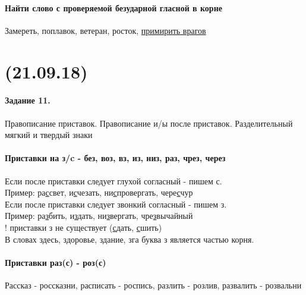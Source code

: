 \documentclass{article}
\begin{document}
\paragraph{Найти слово с проверяемой безударной гласной в корне}

Замереть, поплавок, ветеран, росток, \underline{примирить врагов}




\paragraph{}
\noindent\makebox[\linewidth]{\rule{\paperwidth}{0.4pt}}
\section{(21.09.18)}
\noindent\makebox[\linewidth]{\rule{\paperwidth}{0.4pt}}

\paragraph{Задание 11.} Правописание приставок. Правописание и/ы после приставок.
  Разделительный мягкий и твердый знаки

\paragraph{Приставки на з/c - без, воз, вз, из, низ, раз, чрез, через}
Если после приставки следует глухой согласный - пишем с.\\
Пример: ра\underline{с}свет, и\underline{с}чезать, ни\underline{с}провергать, чере\underline{с}чур\\

Если после приставки следует звонкий согласный - пишем з.\\
Пример: ра\underline{з}бить, и\underline{з}дать, ни\underline{з}вергать, чре\underline{з}вычайный\\

! приставки з не существует (\underline{с}дать, \underline{с}шить)\\

В словах здесь, здоровье, здание, зга буква з является частью корня.\\

\paragraph{Приставки раз(с) - роз(с)}
Рассказ - россказни,
расписать - роспись, 
разлить - розлив, 
развалить - розвальни
\end{document}
